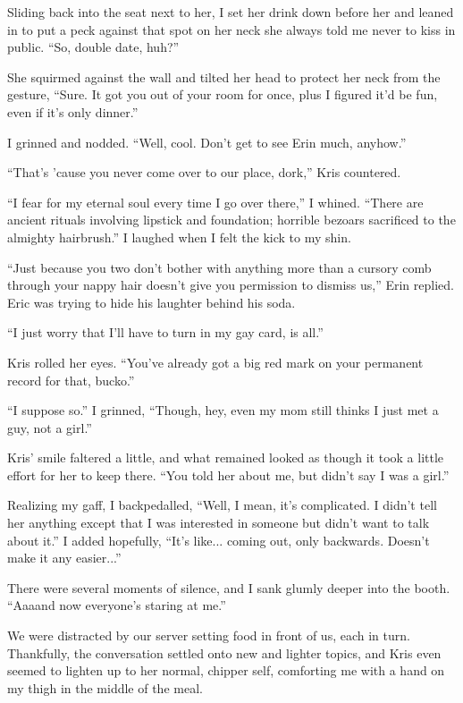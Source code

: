Sliding back into the seat next to her, I set her drink down before her and leaned in to put a peck against that spot on her neck she always told me never to kiss in public.  ``So, double date, huh?''

She squirmed against the wall and tilted her head to protect her neck from the gesture, ``Sure.  It got you out of your room for once, plus I figured it'd be fun, even if it's only dinner.''

I grinned and nodded.  ``Well, cool.  Don't get to see Erin much, anyhow.''

``That's 'cause you never come over to our place, dork,'' Kris countered.

``I fear for my eternal soul every time I go over there,'' I whined. ``There are ancient rituals involving lipstick and foundation; horrible bezoars sacrificed to the almighty hairbrush.''  I laughed when I felt the kick to my shin.

``Just because you two don't bother with anything more than a cursory comb through your nappy hair doesn't give you permission to dismiss us,'' Erin replied.  Eric was trying to hide his laughter behind his soda.

``I just worry that I'll have to turn in my gay card, is all.''

Kris rolled her eyes.  ``You've already got a big red mark on your permanent record for that, bucko.''

``I suppose so.''  I grinned, ``Though, hey, even my mom still thinks I just met a guy, not a girl.''

Kris' smile faltered a little, and what remained looked as though it took a little effort for her to keep there.  ``You told her about me, but didn't say I was a girl.''

Realizing my gaff, I backpedalled, ``Well, I mean, it's complicated.  I didn't tell her anything except that I was interested in someone but didn't want to talk about it.''  I added hopefully, ``It's like... coming out, only backwards.  Doesn't make it any easier...''

There were several moments of silence, and I sank glumly deeper into the booth. ``Aaaand now everyone's staring at me.''

We were distracted by our server setting food in front of us, each in turn.  Thankfully, the conversation settled onto new and lighter topics, and Kris even seemed to lighten up to her normal, chipper self, comforting me with a hand on my thigh in the middle of the meal.

